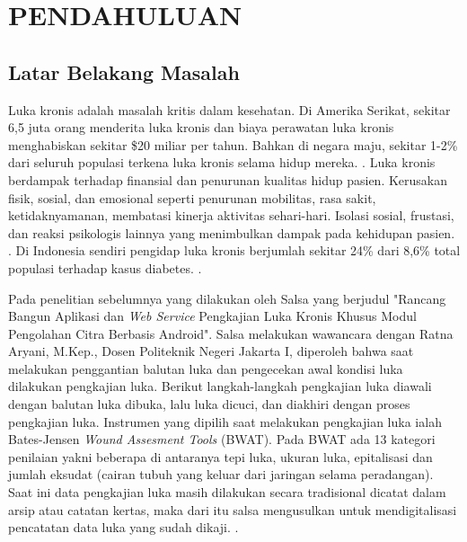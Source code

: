 
\chapter{PENDAHULUAN}
\section{Latar Belakang Masalah}

Luka kronis adalah masalah kritis dalam kesehatan. Di Amerika Serikat, sekitar 6,5 juta orang menderita luka kronis dan biaya perawatan luka kronis menghabiskan sekitar \$20 miliar per tahun. Bahkan di negara maju, sekitar 1-2\% dari seluruh populasi terkena luka kronis selama hidup mereka. \citep{Biswas2018superpixel:1}. Luka kronis berdampak terhadap finansial dan penurunan kualitas hidup pasien. Kerusakan fisik, sosial, dan emosional seperti penurunan mobilitas, rasa sakit, ketidaknyamanan, membatasi kinerja aktivitas sehari-hari. Isolasi sosial, frustasi, dan reaksi psikologis lainnya yang menimbulkan dampak pada kehidupan pasien. \citep{NaiaraVogt2020quality:2}. Di Indonesia sendiri pengidap luka kronis berjumlah sekitar 24\% dari 8,6\% total populasi terhadap kasus diabetes. \citep{Safitri2022hubungan:3}. 

Pada penelitian sebelumnya yang dilakukan oleh Salsa yang berjudul "Rancang Bangun Aplikasi dan \emph{Web Service} Pengkajian Luka Kronis Khusus Modul Pengolahan Citra Berbasis Android". Salsa melakukan wawancara dengan Ratna Aryani, M.Kep., Dosen Politeknik Negeri Jakarta I, diperoleh bahwa saat melakukan penggantian balutan luka dan pengecekan awal kondisi luka dilakukan pengkajian luka. Berikut  langkah-langkah pengkajian luka diawali dengan balutan luka dibuka, lalu luka dicuci, dan diakhiri dengan proses pengkajian luka. Instrumen yang dipilih saat melakukan pengkajian luka ialah Bates-Jensen \emph{Wound Assesment Tools} (BWAT). Pada BWAT ada 13 kategori penilaian yakni beberapa di antaranya  tepi luka, ukuran luka, epitalisasi dan jumlah eksudat (cairan tubuh yang keluar dari jaringan selama peradangan). Saat ini data pengkajian luka masih dilakukan secara tradisional dicatat dalam arsip atau catatan kertas, maka dari itu salsa mengusulkan untuk mendigitalisasi pencatatan data luka yang sudah dikaji. \citep{Rahmadati2023rancang:4}.

